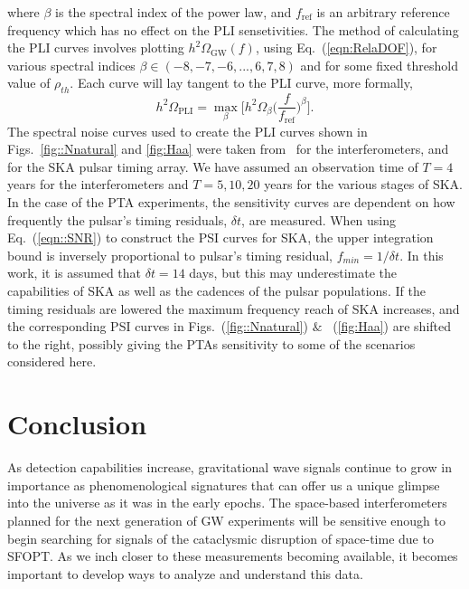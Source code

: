 \documentclass[nofootinbib,twocolumn,preprintnumbers]{revtex4-1}
\begin{document}
where $\beta$ is the spectral index of the power law, and $f_{\textrm{ref}}$ is an arbitrary reference frequency which has no effect on the PLI sensetivities. 
The method of calculating the PLI curves involves plotting $h^2 \Omega_{\textrm{GW}}(f) $, using Eq.~(\ref{eqn:RelaDOF}), for various spectral indices $\beta \in (-8,-7,-6, ... , 6, 7, 8)$ and for some fixed threshold value of $\rho_{th}$. Each curve will lay tangent to the PLI curve, more formally,
\begin{equation}
h^2 \Omega_{\textrm{PLI}} = \max\limits_{\beta}\bigg[ h^2 \Omega_{\beta}\bigg(\frac{f}{f_{\textrm{ref}}}\bigg)^{\beta}  \bigg].
\end{equation}
The spectral noise curves used to create the PLI curves shown in Figs.~\ref{fig::Nnatural} and \ref{fig:Haa} were taken from~\citep{Robson_2019,PhysRevD.83.084036,doi:10.1142/S0218271813410137,10.1093/ptep/pty078, Breitbach:2018ddu} for the interferometers, and ~\citep{Breitbach:2018ddu, Janssen:2014dka} for the SKA pulsar timing array. We have assumed an observation time of $T = 4 $ years for the interferometers and $T= 5, 10, 20 $  years for the various stages of SKA. In the case of the PTA experiments, the sensitivity curves are dependent on how frequently the pulsar's timing residuals, $\delta t$, are measured. When using Eq.~(\ref{eqn::SNR}) to construct the PSI curves for SKA, the upper integration bound is inversely proportional to pulsar's timing residual, $f_{min} = 1/\delta t$. In this work, it is assumed that $\delta t = 14$ days, but this may underestimate the capabilities of SKA as well as the cadences of the pulsar populations. If the timing residuals are lowered the maximum frequency reach of SKA increases, and the corresponding PSI curves in Figs.~(\ref{fig::Nnatural}) $\&$ ~(\ref{fig:Haa}) are shifted to the right, possibly giving the PTAs sensitivity to some of the scenarios considered here.


\section{Conclusion}
\label{sec:conclusion}

As detection capabilities increase, gravitational wave signals continue to grow in importance as phenomenological signatures that can offer us a unique glimpse into the universe as it was in the early epochs. The space-based interferometers planned for the next generation of GW experiments will be sensitive enough to begin searching for signals of the cataclysmic disruption of space-time due to SFOPT. As we inch closer to these measurements becoming available, it becomes important to develop ways to analyze and understand this data.
\end{document}
